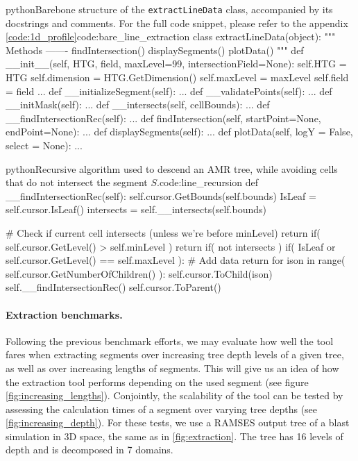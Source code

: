 \documentclass[
	a4paper,
	12pt,
	raggedright,
	twoside
]{tufte-style-article}
\theoremstyle{definition}
\theoremstyle{remark}
\begin{document}
\newpage
\begin{snippetnum}{python}{Barebone structure of the \texttt{extractLineData} class, accompanied by its docstrings and comments. For the full code snippet, please refer to the appendix \ref{code:1d_profile}}{code:bare_line_extraction}
class extractLineData(object):
  """
  Methods
  -------
  findIntersection()
  displaySegments()
  plotData()
  """
  def __init__(self, \Gls{HTG}, field, maxLevel=99, intersectionField=None):
    self.HTG = HTG
    self.dimension = HTG.GetDimension()
    self.maxLevel = maxLevel
    self.field = field
    ...
  def __initializeSegment(self):
    ...
  def __validatePoints(self):
    ...
  def __initMask(self):
    ...
  def __intersects(self, cellBounds):
    ...
  def __findIntersectionRec(self):
    ...
  def findIntersection(self, startPoint=None, endPoint=None):
    ...
  def displaySegments(self):
    ...
  def plotData(self, logY = False, select = None):
    ...
\end{snippetnum}

\begin{snippetnum}{python}{Recursive algorithm used to descend an \Gls{AMR} tree, while avoiding cells that do not intersect the segment $S$.}{code:line_recursion}
def __findIntersectionRec(self):
    self.cursor.GetBounds(self.bounds)
    IsLeaf = self.cursor.IsLeaf()
    intersects = self.__intersects(self.bounds)

    # Check if current cell intersects (unless we're before minLevel)
    return if( self.cursor.GetLevel() > self.minLevel )
    return if( not intersects )
    if( IsLeaf or self.cursor.GetLevel() == self.maxLevel ):
        # Add data
        return
    for ison in range( self.cursor.GetNumberOfChildren() ):
        self.cursor.ToChild(ison)
        self.__findIntersectionRec()
        self.cursor.ToParent()

\end{snippetnum}

\paragraph{Extraction benchmarks.} Following the previous benchmark efforts, we may evaluate how well the tool fares when extracting segments over increasing tree depth levels of a given tree, as well as over increasing lengths of segments. This will give us an idea of how the extraction tool performs depending on the used segment (see figure \ref{fig:increasing_lengths}). Conjointly, the scalability of the tool can be tested by assessing the calculation times of a segment over varying tree depths (see \ref{fig:increasing_depth}). For these tests, we use a RAMSES output tree of a blast simulation in 3D space, the same as in \ref{fig:extraction}. The tree has 16 levels of depth and is decomposed in 7 domains.
\end{document}
